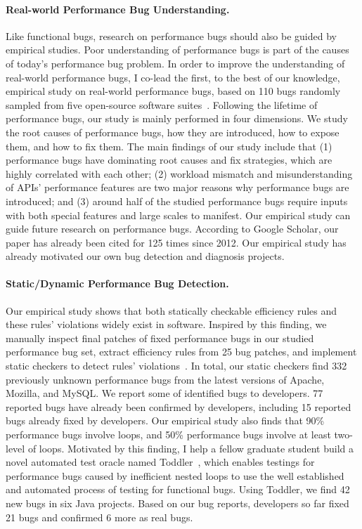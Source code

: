 \documentclass[10pt]{article}
\begin{document}
\paragraph{Real-world Performance Bug Understanding.}
Like functional bugs, research on performance bugs should also be guided by empirical studies. 
Poor understanding of performance bugs is part of the causes of today's performance bug problem. 
In order to improve the understanding of real-world performance bugs, 
I co-lead the first, to the best of our knowledge, 
empirical study on real-world performance bugs, based on 110 bugs randomly sampled from five open-source software suites~\cite{jin12perfbug}. 
Following the lifetime of performance bugs, 
our study is mainly performed in four dimensions. 
We study the root causes of performance bugs, 
how they are introduced, how to expose them, and how to fix them. 
The main findings of our study include that 
(1) performance bugs have dominating root causes and fix strategies, which are highly correlated with each other; 
(2) workload mismatch and misunderstanding of APIs' performance features are two major reasons why performance bugs are introduced; 
and (3) around half of the studied performance bugs require inputs with both special features and large scales to manifest. 
Our empirical study can guide future research on performance bugs. According to Google Scholar, our paper has already been cited for 125 times since 2012. 
Our empirical study has already motivated our own bug detection and diagnosis projects.

\vspace{-.1in}
\paragraph{Static/Dynamic Performance Bug Detection.}
Our empirical study shows that both statically checkable efficiency rules and these rules' violations widely exist in software. 
Inspired by this finding,
we manually inspect final patches of fixed performance bugs in our studied performance bug set, 
extract efficiency rules from 25 bug patches, 
and implement static checkers to detect rules' violations~\cite{jin12perfbug}. 
In total, our static checkers find 332 previously unknown performance bugs from the latest versions of Apache, Mozilla, and MySQL. 
We report some of identified bugs to developers. 
77 reported bugs have already been confirmed by developers, including 15 reported bugs already fixed by developers. 
Our empirical study also finds that 90\% performance bugs involve loops, 
and 50\% performance bugs involve at least two-level of loops. 
Motivated by this finding, I help a fellow graduate student build a novel automated test oracle named Toddler~\cite{Nistor13ICSE},
which enables testings for performance bugs caused by inefficient nested loops to use the well established and automated process of testing for functional bugs. 
Using Toddler, we find 42 new bugs in six Java projects.
Based on our bug reports, developers so far fixed 21 bugs and confirmed 6 more as real bugs.
\end{document}
